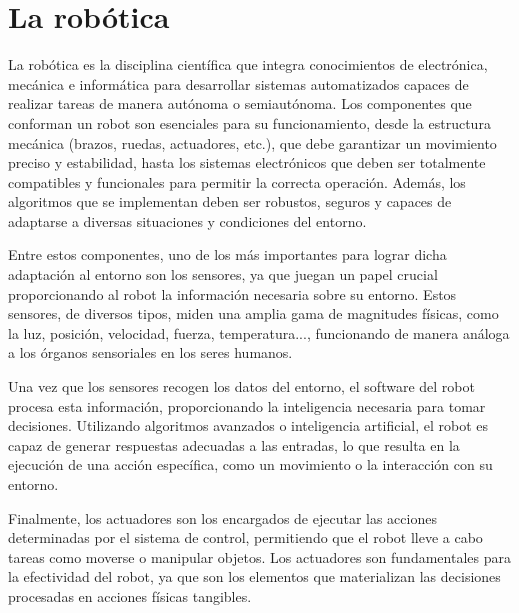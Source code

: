\section{La robótica}
\label{sec:segundaseccion} %

La robótica es la disciplina científica que integra conocimientos de electrónica, mecánica e informática para desarrollar sistemas automatizados capaces de realizar tareas de manera autónoma o semiautónoma. Los componentes que conforman un robot son esenciales para su funcionamiento, desde la estructura mecánica (brazos, ruedas, actuadores, etc.), que debe garantizar un movimiento preciso y estabilidad, hasta los sistemas electrónicos que deben ser totalmente compatibles y funcionales para permitir la correcta operación. Además, los algoritmos que se implementan deben ser robustos, seguros y capaces de adaptarse a diversas situaciones y condiciones del entorno.

Entre estos componentes, uno de los más importantes para lograr dicha adaptación al entorno son los sensores, ya que juegan un papel crucial proporcionando al robot la información necesaria sobre su entorno. Estos sensores, de diversos tipos, miden una amplia gama de magnitudes físicas, como la luz, posición, velocidad, fuerza, temperatura..., funcionando de manera análoga a los órganos sensoriales en los seres humanos. 

Una vez que los sensores recogen los datos del entorno, el software del robot procesa esta información, proporcionando la inteligencia necesaria para tomar decisiones. Utilizando algoritmos avanzados o inteligencia artificial, el robot es capaz de generar respuestas adecuadas a las entradas, lo que resulta en la ejecución de una acción específica, como un movimiento o la interacción con su entorno. 

Finalmente, los actuadores son los encargados de ejecutar las acciones determinadas por el sistema de control, permitiendo que el robot lleve a cabo tareas como moverse o manipular objetos. Los actuadores son fundamentales para la efectividad del robot, ya que son los elementos que materializan las decisiones procesadas en acciones físicas tangibles. 

